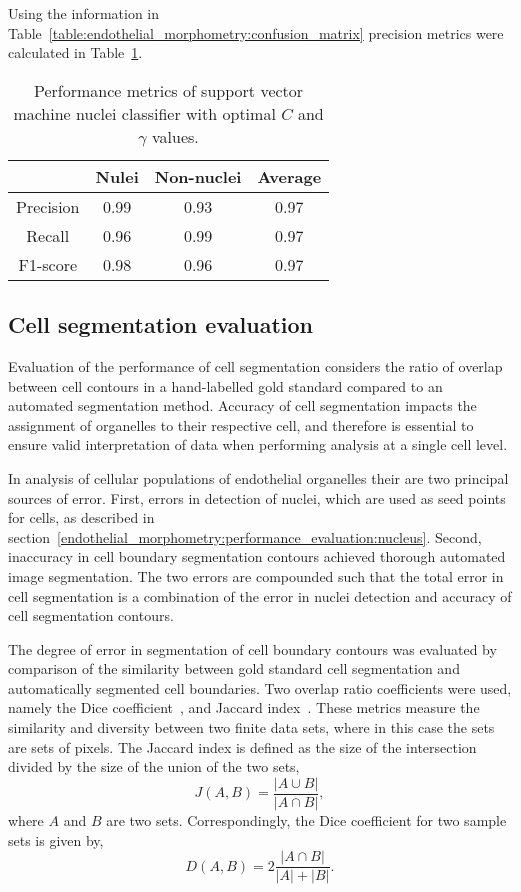 Using the information in Table~\ref{table:endothelial_morphometry:confusion_matrix} precision metrics were calculated in Table~\ref{table:endothelial_morphometry:performance_metrics}.

\begin{table}[htbp]
\caption[Performance metrics of support vector machine nuclei classification]{Performance metrics of support vector machine nuclei classifier with optimal $C$ and $\gamma$ values.}
\centering
\label{table:endothelial_morphometry:performance_metrics}
\begin{tabular}{c c c c}
	\toprule
	& Nulei & Non-nuclei & Average\\
	\midrule
	Precision & 0.99 & 0.93 & 0.97 \\
	Recall    & 0.96 & 0.99 & 0.97 \\
	F1-score  & 0.98 & 0.96 & 0.97 \\
	\bottomrule
\end{tabular}
\end{table}

\subsection{Cell segmentation evaluation}
\label{endothelial_morphometry:performance_evaluation:cell}
Evaluation of the performance of cell segmentation considers the ratio of overlap between cell contours in a hand-labelled gold standard compared to an automated segmentation method. Accuracy of cell segmentation impacts the assignment of organelles to their respective cell, and therefore is essential to ensure valid interpretation of data when performing analysis at a single cell level.

In analysis of cellular populations of endothelial organelles their are two principal sources of error. First, errors in detection of nuclei, which are used as seed points for cells, as described in section~\ref{endothelial_morphometry:performance_evaluation:nucleus}. Second, inaccuracy in cell boundary segmentation contours achieved thorough automated image segmentation. The two errors are compounded such that the total error in cell segmentation is a combination of the error in nuclei detection and accuracy of cell segmentation contours.

The degree of error in segmentation of cell boundary contours was evaluated by comparison of the similarity between gold standard cell segmentation and automatically segmented cell boundaries. Two overlap ratio coefficients were used, namely the Dice coefficient~\cite{Dice1945}, and Jaccard index~\cite{Jaccard1912}. These metrics measure the similarity and diversity between two finite data sets, where in this case the sets are sets of pixels. The Jaccard index is defined as the size of the intersection divided by the size of the union of the two sets,
\begin{equation}
J(A,B) = \frac{|A\cup B|}{|A \cap B|} ,
\end{equation}
where $A$ and $B$ are two sets. Correspondingly, the Dice coefficient for two sample sets is given by,
\begin{equation}
D(A,B) = 2 \frac{|A\cap B|}{|A| + |B|}.
\end{equation}

